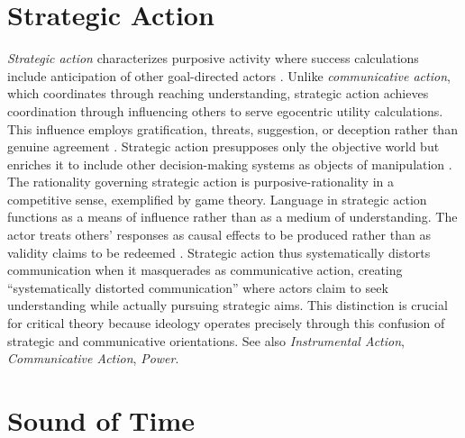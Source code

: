 \documentclass{book}
\begin{document}
\section{Strategic Action}

\textit{Strategic action} characterizes purposive activity where success calculations include anticipation of other goal-directed actors \parencite{Habermas1984}. Unlike \textit{communicative action}, which coordinates through reaching understanding, strategic action achieves coordination through influencing others to serve egocentric utility calculations. This influence employs gratification, threats, suggestion, or deception rather than genuine agreement \parencite{habermas1992individuation}. Strategic action presupposes only the objective world but enriches it to include other decision-making systems as objects of manipulation \parencite{Habermas1984}. The rationality governing strategic action is purposive-rationality in a competitive sense, exemplified by game theory. Language in strategic action functions as a means of influence rather than as a medium of understanding. The actor treats others' responses as causal effects to be produced rather than as validity claims to be redeemed \parencite{habermas1992individuation}. Strategic action thus systematically distorts communication when it masquerades as communicative action, creating ``systematically distorted communication'' where actors claim to seek understanding while actually pursuing strategic aims. This distinction is crucial for critical theory because ideology operates precisely through this confusion of strategic and communicative orientations. See also \textit{Instrumental Action}, \textit{Communicative Action}, \textit{Power}.

\section{Sound of Time}
\end{document}
